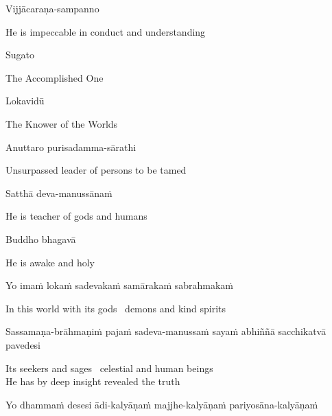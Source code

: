 Vijjācaraṇa-sampanno

\begin{english}
  He is impeccable in conduct and understanding
\end{english}

Sugato

\begin{english}
  The Accomplished One
\end{english}

Lokavidū

\begin{english}
  The Knower of the Worlds
\end{english}

Anuttaro purisadamma-sārathi

\begin{english}
  Unsurpassed leader of persons to be tamed\hyperlink{endnote3-appendix}{\hypertarget{endnote3-body}{}}
\end{english}

Satthā deva-manussānaṁ

\begin{english}
  He is teacher of gods and humans
\end{english}

Buddho bhagavā

\begin{english}
  He is awake and holy
\end{english}

Yo imaṁ lokaṁ sadevakaṁ samārakaṁ sabrahmakaṁ

\begin{english}
  In this world with its gods \breathmark\ demons and kind spirits
  \end{english}

  \begin{pali-hang}
    Sassamaṇa-brāhmaṇiṁ pajaṁ sadeva-manussaṁ sayaṁ abhiññā sacchikatvā pavedesi
  \end{pali-hang}

  \begin{english}
    Its seekers and sages \breathmark\ celestial and human beings\\
    He has by deep insight revealed the truth
  \end{english}

  \begin{pali-hang}
    Yo dhammaṁ desesi ādi-kalyāṇaṁ majjhe-kalyāṇaṁ pariyosāna-kalyāṇaṁ
  \end{pali-hang}


